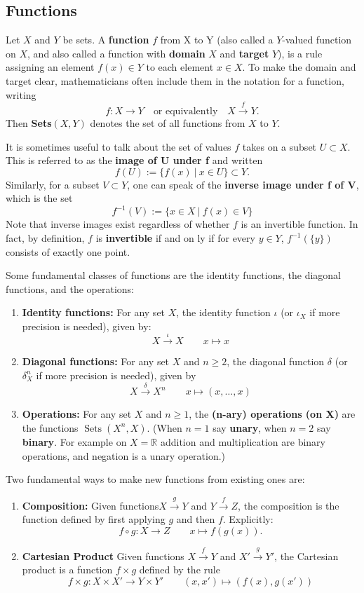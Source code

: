 \documentclass[12pt]{amsart}
\numberwithin{equation}{section}
\newcommand\Rb{{\mathbb R}} %
\newcommand{\diag}{\delta}
\newcommand{\id}{\iota}
\newcommand{\To}{\longrightarrow}
\newcommand{\mTo}{\longmapsto}
\newcommand{\pipe}{\:|\:}
\newcommand{\Tof}[1]{\stackrel{#1}{\!\longrightarrow\!}}
\DeclareMathOperator{\Sets}{Sets}
\begin{document}
\subsection{Functions} Let $X$ and $Y$ be sets.  A \textbf{function} $f$ from X to Y (also called a $Y$-valued function on $X$, and also called a function with \textbf{domain} $X$ and \textbf{target} $Y$), is a rule assigning an element $f(x)\in Y$ to each element $x\in X$.  To make the domain and target clear, mathematicians often include them in the notation for a function, writing
 \[f:X\To Y\quad\text{or equivalently}\quad X\Tof{f}Y.\]
 Then \textbf{Sets}$(X,Y)$ denotes the set of all functions from $X$ to $Y$.
 
It is sometimes useful to talk about the set of values $f$ takes on a subset $U\subset X$.  This is referred to as the \textbf{image of U under f} and written $$f(U):=\{ f(x)\pipe x\in U\}\subset Y.$$
Similarly, for a subset $V\subset Y$, one can speak of the \textbf{inverse image under f of V}, which is the set $$f^{-1}(V):=\{ x\in X\pipe f(x)\in V \}$$  
Note that inverse images exist regardless of whether $f$ is an invertible function.  In fact, by definition, $f$ is \textbf{invertible} if and on ly if for every $y\in Y$, $f^{-1}(\{y\})$ consists of exactly one point.

Some fundamental classes of functions are the identity functions, the diagonal functions, and the operations:
\begin{enumerate}
\item \textbf{Identity functions:} For any set $X$, the identity function $\id$ (or $\id_X$ if more precision is needed), given by:
 \[   X\Tof{\id}X \qquad x\mTo x   \]
 \item \textbf{Diagonal functions:} For any set $X$ and $n\geq 2$, the diagonal function $\diag$ (or $\diag_X^n$ if more precision is needed), given by
 \[   X\Tof{\diag}X^n \qquad x\mTo (x,\dots,x)   \]
 \item \textbf{Operations:} For any set $X$ and $n\geq 1$, the \textbf{(n-ary) operations (on X)} are the functions $\Sets(X^n,X)$.  (When $n=1$ say \textbf{unary}, when $n=2$ say \textbf{binary}.  For example on $X=\Rb$ addition and multiplication are binary operations, and negation is a unary operation.)
\end{enumerate}

Two fundamental ways to make new functions from existing ones are:
\begin{enumerate}
\item \textbf{Composition:} Given functions$X\Tof{g} Y$ and $Y\Tof{f} Z$, the composition is the function defined by first applying $g$ and then $f$.  Explicitly:
 \[f\circ g:X\To Z \qquad x\mTo f(g(x)).\]
 \item \textbf{Cartesian Product} Given functions $X\Tof{f} Y$ and $X'\Tof{g} Y'$, the Cartesian product is a function $f\times g$ defined by the rule
 \[f\times g:X\times X' \To Y\times Y' \qquad (x,x')\mTo (f(x),g(x'))\]
\end{enumerate}
\end{document}
